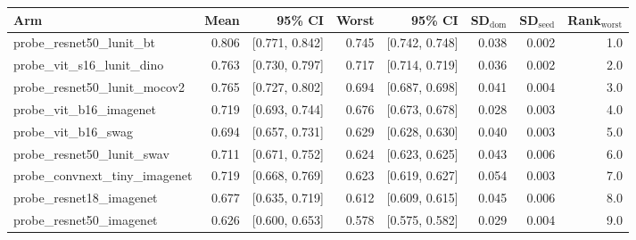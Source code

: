 \begin{tabular}{lrrrrrrr}
\toprule
Arm & Mean & 95\% CI & Worst & 95\% CI & SD$_\text{dom}$ & SD$_\text{seed}$ & Rank$_\text{worst}$ \\
\midrule
probe\_resnet50\_lunit\_bt & 0.806 & [0.771, 0.842] & 0.745 & [0.742, 0.748] & 0.038 & 0.002 & 1.0 \\
probe\_vit\_s16\_lunit\_dino & 0.763 & [0.730, 0.797] & 0.717 & [0.714, 0.719] & 0.036 & 0.002 & 2.0 \\
probe\_resnet50\_lunit\_mocov2 & 0.765 & [0.727, 0.802] & 0.694 & [0.687, 0.698] & 0.041 & 0.004 & 3.0 \\
probe\_vit\_b16\_imagenet & 0.719 & [0.693, 0.744] & 0.676 & [0.673, 0.678] & 0.028 & 0.003 & 4.0 \\
probe\_vit\_b16\_swag & 0.694 & [0.657, 0.731] & 0.629 & [0.628, 0.630] & 0.040 & 0.003 & 5.0 \\
probe\_resnet50\_lunit\_swav & 0.711 & [0.671, 0.752] & 0.624 & [0.623, 0.625] & 0.043 & 0.006 & 6.0 \\
probe\_convnext\_tiny\_imagenet & 0.719 & [0.668, 0.769] & 0.623 & [0.619, 0.627] & 0.054 & 0.003 & 7.0 \\
probe\_resnet18\_imagenet & 0.677 & [0.635, 0.719] & 0.612 & [0.609, 0.615] & 0.045 & 0.006 & 8.0 \\
probe\_resnet50\_imagenet & 0.626 & [0.600, 0.653] & 0.578 & [0.575, 0.582] & 0.029 & 0.004 & 9.0 \\
\bottomrule
\end{tabular}
